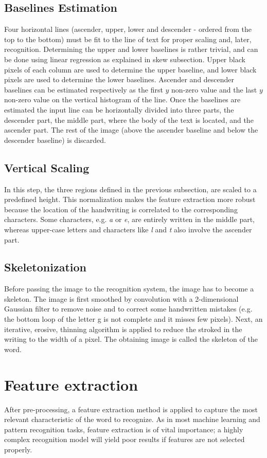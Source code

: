 \documentclass[conference]{IEEEtran}
\begin{document}
\subsection{Baselines Estimation}
Four horizontal lines (ascender, upper, lower and descender - ordered from the top to the bottom) must be fit to the line of text for proper scaling and, later, recognition. Determining the upper and lower baselines is rather trivial, and can be done using linear regression as explained in skew subsection. Upper black pixels of each column are used to determine the upper baseline, and lower black pixels are used to determine the lower baselines. Ascender and descender baselines can be estimated respectively as the first $y$ non-zero value and the last $y$ non-zero value on the vertical histogram of the line. Once the baselines are estimated the input line can be horizontally divided into three parts, the descender part, the middle part, where the body of the text is located, and the ascender part. The rest of the image (above the ascender baseline and below the descender baseline) is discarded. 

\subsection{Vertical Scaling}
In this step, the three regions defined in the previous subsection, are scaled to a predefined height. This normalization makes the feature extraction more robust because the location of the handwriting is correlated to the corresponding characters. Some characters, e.g. {\it a} or {\it e}, are entirely written in the middle part, whereas upper-case letters and characters like {\it l} and {\it t} also involve the ascender part.

\subsection{Skeletonization}
Before passing the image to the recognition system, the image has to become a skeleton. The image is first smoothed by convolution with a 2-dimensional Gaussian filter to remove noise and to correct some handwritten mistakes (e.g. the bottom loop of the letter g is not complete and it misses few pixels). Next, an iterative, erosive, thinning algorithm is applied to reduce the stroked in the writing to the width of a pixel. The obtaining image is called the skeleton of the word. 

\section{Feature extraction}\label{featureExtraction}
After pre-processing, a feature extraction method is applied to capture the most relevant characteristic of the word to recognize. As in most machine learning and pattern recognition tasks, feature extraction is of vital importance; a highly complex recognition model will yield poor results if features are not selected properly.
\end{document}
